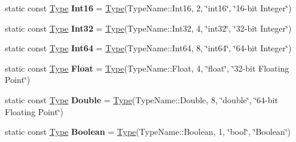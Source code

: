 \begin{DoxyCompactItemize}
\item 
\mbox{\label{class_arcana_1_1_types_a6022cc2b4ef06dec700d0266745c5356}} 
static const \mbox{\hyperlink{class_arcana_1_1_type}{Type}} {\bfseries Int16} = \mbox{\hyperlink{class_arcana_1_1_type}{Type}}(Type\+Name\+::\+Int16, 2, \char`\"{}int16\char`\"{}, \char`\"{}16-\/bit Integer\char`\"{})
\item 
\mbox{\label{class_arcana_1_1_types_a5f94602ba364e6184b78e19145bb921d}} 
static const \mbox{\hyperlink{class_arcana_1_1_type}{Type}} {\bfseries Int32} = \mbox{\hyperlink{class_arcana_1_1_type}{Type}}(Type\+Name\+::\+Int32, 4, \char`\"{}int32\char`\"{}, \char`\"{}32-\/bit Integer\char`\"{})
\item 
\mbox{\label{class_arcana_1_1_types_a376799e4dac8cda83124e2d15e0b4c68}} 
static const \mbox{\hyperlink{class_arcana_1_1_type}{Type}} {\bfseries Int64} = \mbox{\hyperlink{class_arcana_1_1_type}{Type}}(Type\+Name\+::\+Int64, 8, \char`\"{}int64\char`\"{}, \char`\"{}64-\/bit Integer\char`\"{})
\item 
\mbox{\label{class_arcana_1_1_types_a18d5fbe24be4a3e5c4619147c8bf7352}} 
static const \mbox{\hyperlink{class_arcana_1_1_type}{Type}} {\bfseries Float} = \mbox{\hyperlink{class_arcana_1_1_type}{Type}}(Type\+Name\+::\+Float, 4, \char`\"{}float\char`\"{}, \char`\"{}32-\/bit Floating Point\char`\"{})
\item 
\mbox{\label{class_arcana_1_1_types_a57c098ffdb6f98b28c139cc59e9c6139}} 
static const \mbox{\hyperlink{class_arcana_1_1_type}{Type}} {\bfseries Double} = \mbox{\hyperlink{class_arcana_1_1_type}{Type}}(Type\+Name\+::\+Double, 8, \char`\"{}double\char`\"{}, \char`\"{}64-\/bit Floating Point\char`\"{})
\item 
\mbox{\label{class_arcana_1_1_types_ab1e5105ed1caec42d68e2385bd67ad03}} 
static const \mbox{\hyperlink{class_arcana_1_1_type}{Type}} {\bfseries Boolean} = \mbox{\hyperlink{class_arcana_1_1_type}{Type}}(Type\+Name\+::\+Boolean, 1, \char`\"{}bool\char`\"{}, \char`\"{}Boolean\char`\"{})
\item 
\mbox{\label{class_arcana_1_1_types_a9d99d96412d7803d0fddce6c028737dd}} 

\end{DoxyCompactItemize}
